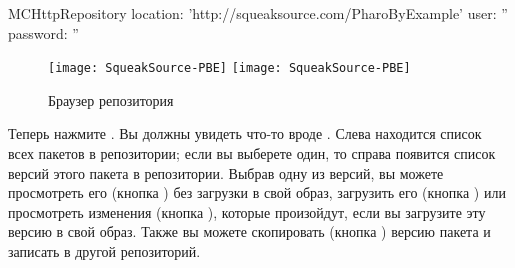 \documentclass[a4paper,10pt,twoside]{book}
\begin{document}
\begin{code}{}
MCHttpRepository
	location: 'http://squeaksource.com/PharoByExample'
	user: ''
	password: ''
\end{code}

\begin{figure}[btp]
	\begin{center}
	\ifluluelse
		{\texttt{[image: SqueakSource-PBE]}}
		{\texttt{[image: SqueakSource-PBE]}}
	\end{center}
	\caption{Браузер репозитория}
\end{figure}
\noindent


Теперь нажмите . Вы должны увидеть что-то вроде . Слева находится список всех пакетов в репозитории; если вы выберете один, то справа появится список версий этого пакета в репозитории. Выбрав одну из версий, вы можете просмотреть его (кнопка ) без загрузки в свой образ, загрузить его (кнопка ) или просмотреть изменения (кнопка ), которые произойдут, если вы загрузите эту версию в свой образ. Также вы можете скопировать (кнопка ) версию пакета и записать в другой репозиторий.

\end{document}
